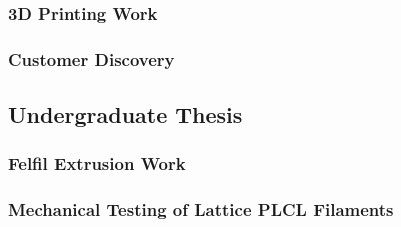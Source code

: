 \subsubsection{3D Printing Work\label{sec:introduction:priorWork:otherTeamWork:3dPrinting}}

\subsubsection{Customer Discovery\label{sec:introduction:priorWork:otherTeamWork:customerDiscovery}}

\subsection{Undergraduate Thesis\label{sec:introduction:priorWork:undergradThesis}}

\subsubsection{Felfil Extrusion Work\label{sec:introduction:priorWork:undergradThesis:felfil}}

\subsubsection{Mechanical Testing of Lattice PLCL Filaments\label{sec:introduction:priorWork:undergradThesis:mechTesting}}
